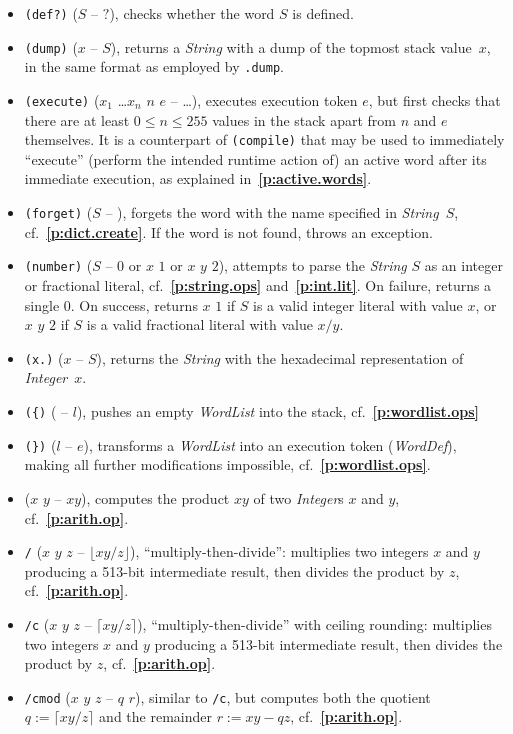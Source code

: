 \documentclass[12pt,oneside]{article}
\def\refpoint#1{{\rm\textbf{\ref{#1}}}}
\let\ptref=\refpoint
\begin{document}
\begin{itemize}
\item {\tt (def?)} ($S$ -- $?$), checks whether the word $S$ is defined.
\item {\tt (dump)} ($x$ -- $S$), returns a {\em String\/} with a dump of the topmost stack value~$x$, in the same format as employed by {\tt .dump}.
\item {\tt (execute)} ($x_1$ \dots $x_n$ $n$ $e$ -- \dots), executes execution token $e$, but first checks that there are at least $0\leq n\leq 255$ values in the stack apart from $n$ and $e$ themselves. It is a counterpart of {\tt (compile)} that may be used to immediately ``execute'' (perform the intended runtime action of) an active word after its immediate execution, as explained in~\ptref{p:active.words}.
\item {\tt (forget)} ($S$ -- ), forgets the word with the name specified in {\em String}~$S$, cf.~\ptref{p:dict.create}. If the word is not found, throws an exception.
\item {\tt (number)} ($S$ -- $0$ or $x$ $1$ or $x$ $y$ $2$), attempts to parse the {\em String\/} $S$ as an integer or fractional literal, cf.~\ptref{p:string.ops} and~\ptref{p:int.lit}. On failure, returns a single $0$. On success, returns $x$ $1$ if $S$ is a valid integer literal with value $x$, or $x$ $y$ $2$ if $S$ is a valid fractional literal with value $x/y$.
\item {\tt (x.)} ($x$ -- $S$), returns the {\em String\/} with the hexadecimal representation of {\em Integer\/}~$x$.
\item {\tt (\{)} ( -- $l$), pushes an empty {\em WordList\/} into the stack, cf.~\ptref{p:wordlist.ops}
\item {\tt (\})} ($l$ -- $e$), transforms a {\em WordList\/} into an execution token ({\em WordDef\/}), making all further modifications impossible, cf.~\ptref{p:wordlist.ops}.
\item {\tt *} ($x$ $y$ -- $xy$), computes the product $xy$ of two {\em Integer\/}s $x$ and $y$, cf.~\ptref{p:arith.op}.
\item {\tt */} ($x$ $y$ $z$ -- $\lfloor xy/z\rfloor$), ``multiply-then-divide'': multiplies two integers $x$ and $y$ producing a 513-bit intermediate result, then divides the product by $z$, cf.~\ptref{p:arith.op}.
\item {\tt */c} ($x$ $y$ $z$ -- $\lceil xy/z\rceil$), ``multiply-then-divide'' with ceiling rounding: multiplies two integers $x$ and $y$ producing a 513-bit intermediate result, then divides the product by $z$, cf.~\ptref{p:arith.op}.
\item {\tt */cmod} ($x$ $y$ $z$ -- $q$ $r$), similar to {\tt */c}, but computes both the quotient $q:=\lceil xy/z\rceil$ and the remainder $r:=xy-qz$, cf.~\ptref{p:arith.op}.

\end{itemize}
\end{document}
